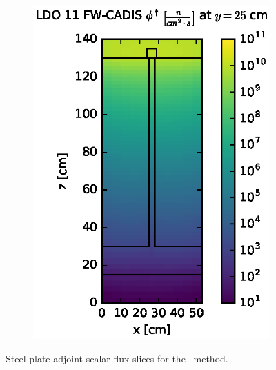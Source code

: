 \begin{figure}[!htb]
\begin{subfigure}{0.4\textwidth}
\includegraphics[max height=0.445\textheight]
{img/steel-plots/fwc-adj/flux-ldo11-slice.eps}
\end{subfigure}
\caption{Steel plate adjoint scalar flux slices for the \fwc\ method.}
\label{steel-fwc-adj-slices}
\end{figure}

